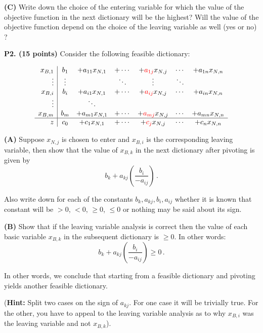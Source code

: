 \documentclass[11pt]{article}
\newcommand\red[1]{\textcolor{red}{#1}}
\begin{document}
\medskip

\noindent\textbf{(C)} Write down the choice of the entering variable
for which the value of the objective function in the next dictionary
will be the highest? Will the value of the objective function depend
on the choice of the leaving variable as well (yes or no) ?

\medskip


\textbf{P2. (15 points)}  Consider the following feasible dictionary:

\[\begin{array}{r|c c c c c c c c}
x_{B,1} & b_1 & + a_{11} x_{N,1} & + \cdots & + \red{a_{1j}} x_{N,j} & \cdots & + a_{1n} x_{N,n}\\
\vdots & \vdots &  & \ddots & \vdots & \ddots  \\
x_{B,i} & b_i & +a_{i1} x_{N,1} & + \cdots & +\red{ a_{ij}} x_{N,j} & \cdots
                                                                & + a_{in} x_{N,n} \\
\vdots & & \ddots & \\ 
x_{B,m} & b_m & + a_{m1} x_{N,1} & + \cdots & +\red{ a_{mj} } x_{N,j} &
                                                                 \cdots  & + a_{mn} x_{N,n} \\
\hline
z & c_0 & + c_1 x_{N,1} & + \cdots & + \red{c_j} x_{N,j} & \cdots & + c_n x_{N,n}\\
\end{array}\]

\noindent \textbf{(A)} Suppose $x_{N,j}$ is chosen to enter and
$x_{B,i}$ is the corresponding leaving variable, then show that the
value of $x_{B,k}$ in the next dictionary after pivoting is given by
\[ b_k + a_{kj} \left(\frac{b_i}{ - a_{ij}}\right)  \,.\]

Also write down for each of the constants $b_k, a_{kj}, b_i, a_{ij}$
whether it is known that constant will be $> 0$, $< 0$, $\geq 0$,
$\leq 0$ or nothing may be said about its sign.

\medskip

\noindent \textbf{(B)} Show that if the leaving variable analysis is
correct then  the value of each basic variable $x_{B,k}$ in the
subsequent 
dictionary is  $\geq 0$. In other words: 
\[  b_k + a_{kj} \left(\frac{b_i}{ - a_{ij}}\right)  \geq 0 \,.\]

In other words, we conclude that starting from a feasible dictionary
and pivoting yields another feasible dictionary.

(\textbf{Hint:} Split two cases on the sign of $a_{kj}$. For one case
it will be trivially true. For the other, you have to appeal to the
leaving variable analysis as to why $x_{B,i}$ was the leaving variable and
not $x_{B,k}$).
\end{document}
